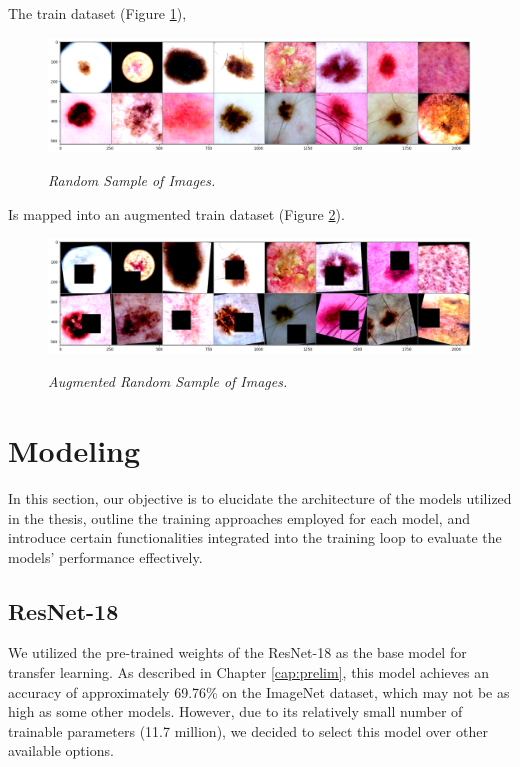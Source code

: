 The train dataset (Figure \ref{fig:sample-of-datasets}),

\begin{figure}[H]
  \centering
  \includegraphics[width=\textwidth]{imatges/methodological_contribution/random-sample-of-isic.png}
  \caption[Random Sample of Images]{\textit{Random Sample of Images.}}
  {\label{fig:sample-of-datasets}}
\end{figure}

Is mapped into an augmented train dataset (Figure \ref{fig:aug-sample-of-datasets}).

\begin{figure}[H]
  \centering
  \includegraphics[width=\textwidth]{imatges/methodological_contribution/random-sample-of-isic-augmented.png}
  \caption[Augmented Random Sample of Images]{\textit{Augmented Random Sample of Images.}}
  {\label{fig:aug-sample-of-datasets}}
\end{figure}

\newpage

\section{Modeling}

In this section, our objective is to elucidate the architecture of the models
utilized in the thesis, outline the training approaches employed for each
model, and introduce certain functionalities integrated into the training loop
to evaluate the models' performance effectively.

\subsection{ResNet-18}

We utilized the pre-trained weights of the ResNet-18 as the base model
for transfer learning. As described in Chapter \ref{cap:prelim}, this
model achieves an accuracy of approximately 69.76\% on the ImageNet
dataset, which may not be as high as some other models. However, due to its
relatively small number of trainable parameters (11.7 million), we decided to
select this model over other available options. \\

